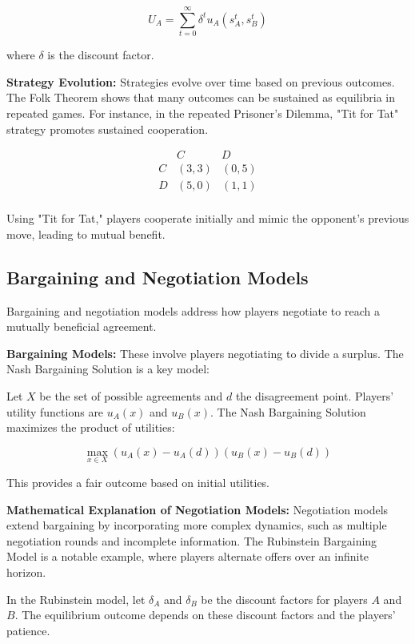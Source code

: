 \documentclass[12pt]{book} %
\begin{document}
\[
U_A = \sum_{t=0}^{\infty} \delta^t u_A(s_A^t, s_B^t)
\]

where \( \delta \) is the discount factor.

\textbf{Strategy Evolution:}
Strategies evolve over time based on previous outcomes. The Folk Theorem shows that many outcomes can be sustained as equilibria in repeated games. For instance, in the repeated Prisoner's Dilemma, "Tit for Tat" strategy promotes sustained cooperation.

\[
\begin{array}{c|c|c}
& C & D \\
\hline
C & (3, 3) & (0, 5) \\
\hline
D & (5, 0) & (1, 1) \\
\end{array}
\]

Using "Tit for Tat," players cooperate initially and mimic the opponent's previous move, leading to mutual benefit.

\subsection{Bargaining and Negotiation Models}

Bargaining and negotiation models address how players negotiate to reach a mutually beneficial agreement.

\textbf{Bargaining Models:}
These involve players negotiating to divide a surplus. The Nash Bargaining Solution is a key model:

Let \( X \) be the set of possible agreements and \( d \) the disagreement point. Players' utility functions are \( u_A(x) \) and \( u_B(x) \). The Nash Bargaining Solution maximizes the product of utilities:

\[
\max_{x \in X} (u_A(x) - u_A(d))(u_B(x) - u_B(d))
\]

This provides a fair outcome based on initial utilities.


\textbf{Mathematical Explanation of Negotiation Models:}
Negotiation models extend bargaining by incorporating more complex dynamics, such as multiple negotiation rounds and incomplete information. The Rubinstein Bargaining Model is a notable example, where players alternate offers over an infinite horizon.

In the Rubinstein model, let $\delta_A$ and $\delta_B$ be the discount factors for players $A$ and $B$. The equilibrium outcome depends on these discount factors and the players' patience.
\end{document}
